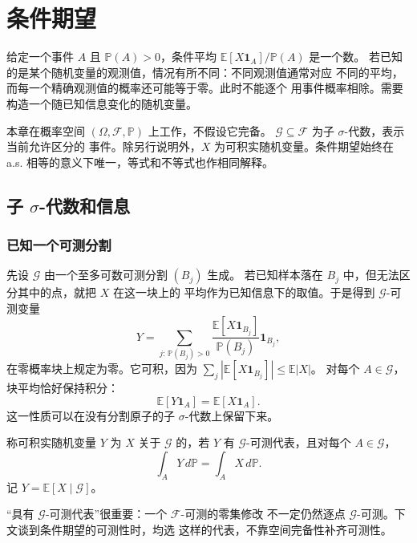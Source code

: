 \chapter{条件期望}
\label{chap:conditional-expectation}

给定一个事件 $A$ 且 $\mathbb P(A)>0$，条件平均
$\mathbb E[X\mathbf1_A]/\mathbb P(A)$ 是一个数。
若已知的是某个随机变量的观测值，情况有所不同：不同观测值通常对应
不同的平均，而每一个精确观测值的概率还可能等于零。此时不能逐个
用事件概率相除。需要构造一个随已知信息变化的随机变量。

本章在概率空间 $(\Omega,\mathcal F,\mathbb P)$ 上工作，不假设它完备。
$\mathcal G\subseteq\mathcal F$ 为子 $\sigma$-代数，表示当前允许区分的
事件。除另行说明外，$X$ 为可积实随机变量。条件期望始终在 a.s.
相等的意义下唯一，等式和不等式也作相同解释。

\section{子 \texorpdfstring{$\sigma$}{sigma}-代数和信息}
\label{sec:conditional-information}

\subsection{已知一个可测分割}

先设 $\mathcal G$ 由一个至多可数可测分割 $(B_j)$ 生成。
若已知样本落在 $B_j$ 中，但无法区分其中的点，就把 $X$ 在这一块上的
平均作为已知信息下的取值。于是得到 $\mathcal G$-可测变量
\[
 Y=\sum_{j:\,\mathbb P(B_j)>0}
       \frac{\mathbb E[X\mathbf1_{B_j}]}{\mathbb P(B_j)}\mathbf1_{B_j},
\]
在零概率块上规定为零。它可积，因为
$\sum_j|\mathbb E[X\mathbf1_{B_j}]|\le\mathbb E|X|$。
对每个 $A\in\mathcal G$，块平均恰好保持积分：
\[
 \mathbb E[Y\mathbf1_A]=\mathbb E[X\mathbf1_A].
\]
这一性质可以在没有分割原子的子 $\sigma$-代数上保留下来。

\begin{definition}
\label{def:conditional-expectation}
称可积实随机变量 $Y$ 为 $X$ 关于 $\mathcal G$ 的，若
$Y$ 有 $\mathcal G$-可测代表，且对每个 $A\in\mathcal G$，
\begin{equation}
\label{eq:conditional-integral-characterization}
 \int_A Y\,d\mathbb P=\int_A X\,d\mathbb P.
\end{equation}
记 $Y=\mathbb E[X\mid\mathcal G]$。
\end{definition}

“具有 $\mathcal G$-可测代表”很重要：一个 $\mathcal F$-可测的零集修改
不一定仍然逐点 $\mathcal G$-可测。下文谈到条件期望的可测性时，均选
这样的代表，不靠空间完备性补齐可测性。

